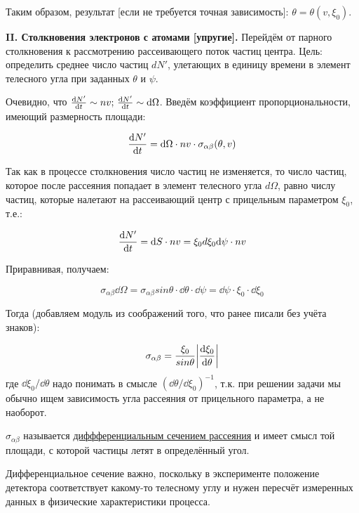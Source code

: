 \documentclass[10pt, a4paper]{article}
\begin{document}
Таким образом, результат [если не требуется точная зависимость]: $\theta = \theta(v, \xi_0)$.

{\bfseries \large II. Столкновения электронов с атомами [упругие].} Перейдём от парного столкновения к рассмотрению рассеивающего поток частиц центра. Цель: определить среднее число частиц $dN'$, улетающих в единицу времени в элемент телесного угла при заданных $\theta$ и $\psi$.

Очевидно, что $\dv{N'}{t} \sim nv;\, \dv{N'}{t} \sim \dd \Omega$. Введём коэффициент пропорциональности, имеющий размерность площади:

\begin{equation*}
	\dv{N'}{t} = \dd\Omega\cdot nv \cdot \sigma_{\alpha\beta}(\theta, v)
\end{equation*}

Так как в процессе столкновения число частиц не изменяется, то число частиц, которое после рассеяния попадает в элемент телесного угла $d\Omega$, равно числу частиц, которые налетают на рассеивающий центр с прицельным параметром $\xi_0$, т.е.:

\begin{equation*}
	\dv{N'}{t} = \dd S \cdot nv = \xi_0 d\xi_0 \dd\psi   \cdot nv
\end{equation*}

Приравнивая, получаем:

\begin{equation*}
	\sigma_{\alpha\beta} \dd\Omega = \sigma_{\alpha\beta} sin\theta \cdot \dd\theta \cdot \dd\psi = \dd\psi \cdot \xi_0 \cdot \dd\xi_0
\end{equation*}

Тогда (добавляем модуль из соображений того, что ранее писали без учёта знаков):

\begin{equation} \label{eq:transport_cs}
	\sigma_{\alpha\beta} = \frac{\xi_0}{sin\theta}\abs{\dv{\xi_0}{\theta}}
\end{equation}
где $\dd\xi_0/\dd\theta$ надо понимать в смысле $(\dd\theta/\dd\xi_0)^{-1}$, т.к. при решении задачи мы обычно ищем зависимость угла рассеяния от прицельного параметра, а не наоборот.

$\sigma_{\alpha\beta}$ называется \uline{диффференциальным сечением рассеяния} и имеет смысл той площади, с которой частицы летят в определённый угол.

Дифференциальное сечение важно, поскольку в эксперименте положение детектора соответствует какому-то телесному углу и нужен пересчёт измеренных данных в физические характеристики процесса.
\end{document}
